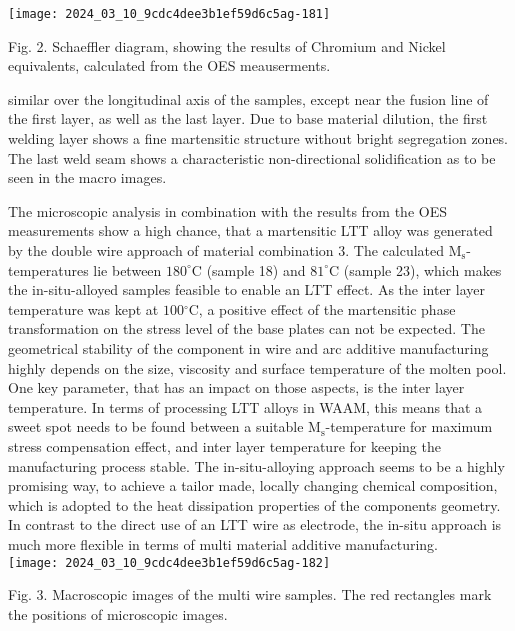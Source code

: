 \documentclass[10pt]{article}
\begin{document}
\begin{center}
\texttt{[image: 2024\_03\_10\_9cdc4dee3b1ef59d6c5ag-181]}
\end{center}

Fig. 2. Schaeffler diagram, showing the results of Chromium and Nickel equivalents, calculated from the OES meauserments.

similar over the longitudinal axis of the samples, except near the fusion line of the first layer, as well as the last layer. Due to base material dilution, the first welding layer shows a fine martensitic structure without bright segregation zones. The last weld seam shows a characteristic non-directional solidification as to be seen in the macro images.

The microscopic analysis in combination with the results from the OES measurements show a high chance, that a martensitic LTT alloy was generated by the double wire approach of material combination 3. The calculated $\mathrm{M}_{\mathrm{s}}$-temperatures lie between $180^{\circ} \mathrm{C}$ (sample 18) and $81^{\circ} \mathrm{C}$ (sample 23), which makes the in-situ-alloyed samples feasible to enable an LTT effect. As the inter layer temperature was kept at $100{ }^{\circ} \mathrm{C}$, a positive effect of the martensitic phase transformation on the stress level of the base plates can not be expected. The geometrical stability of the component in wire and arc additive manufacturing highly depends on the size, viscosity and surface temperature of the molten pool. One key parameter, that has an impact on those aspects, is the inter layer temperature. In terms of processing LTT alloys in WAAM, this means that a sweet spot needs to be found between a suitable $\mathrm{M}_{\mathrm{s}}$-temperature for maximum stress compensation effect, and inter layer temperature for keeping the manufacturing process stable. The in-situ-alloying approach seems to be a highly promising way, to achieve a tailor made, locally changing chemical composition, which is adopted to the heat dissipation properties of the components geometry. In contrast to the direct use of an LTT wire as electrode, the in-situ approach is much more flexible in terms of multi material additive manufacturing.\\
\texttt{[image: 2024\_03\_10\_9cdc4dee3b1ef59d6c5ag-182]}

Fig. 3. Macroscopic images of the multi wire samples. The red rectangles mark the positions of microscopic images.
\end{document}
